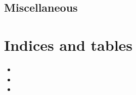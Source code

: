 \documentclass[letterpaper,10pt,english]{sphinxmanual}
\begin{document}
\section{Miscellaneous}
\label{\detokenize{publications:miscellaneous}}

\chapter{Indices and tables}
\label{\detokenize{index:indices-and-tables}}\begin{itemize}
\item {} 

\item {} 

\item {} 

\end{itemize}



\renewcommand{\indexname}{Index}
\printindex
\end{document}
